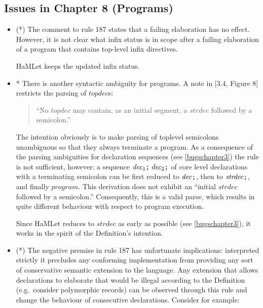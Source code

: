 \documentclass[twoside,titlepage]{article}
\begin{document}
\begin{appendix}
\subsection{Issues in Chapter 8 (Programs)}
\label{bugschapter8}

\begin{itemize}
\item (*) The comment to rule 187 states that a failing elaboration has no effect. However, it is not clear what infix status is in scope after a failing elaboration of a program that contains top-level infix directives.

HaMLet keeps the updated infix status.

\item * There is another syntactic ambiguity for programs. A note in [3.4, Figure 8] restricts the parsing of $\mathit{topdec}$s:

\begin{quote}
``No $\mathit{topdec}$ may contain, as an initial segment, a $\mathit{strdec}$ followed by a semicolon.''
\end{quote}

The intention obviously is to make parsing of toplevel semicolons unambiguous so that they always terminate a program. As a consequence of the parsing ambiguities for declaration sequences (see \ref{bugschapter3}) the rule is not sufficient, however: a sequence $\mathit{dec}_1\mbox{\tt;}\;\mathit{dec}_2\mbox{\tt;}$ of core level declarations with a terminating semicolon can be first reduced to $\mathit{dec}\mbox{\tt;}$, then to $\mathit{strdec}\mbox{\tt;}$, and finally $\mathit{program}$. This derivation does not exhibit an ``initial $\mathit{strdec}$ followed by a semicolon.'' Consequently, this is a valid parse, which results in quite different behaviour with respect to program execution.

Since HaMLet reduces to $\mathit{strdec}$ as early as possible (see \ref{bugschapter3}), it works in the spirit of the Definition's intention.

\item (*) The negative premise in rule 187 has unfortunate implications: interpreted strictly it precludes any conforming implementation from providing any sort of conservative semantic extension to the language. Any extension that allows declarations to elaborate that would be illegal according to the Definition (e.g.\ consider polymorphic records) can be observed through this rule and change the behaviour of consecutive declarations. Consider for example:


\end{itemize}
\end{appendix}
\end{document}

